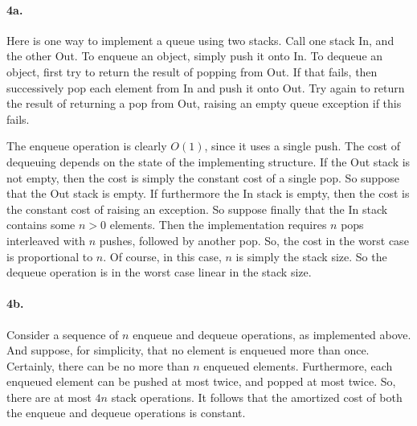 \documentclass[
]{article}
\begin{document}
\paragraph{4a.} Here is one way to implement a queue using two stacks. Call one stack In, and the other Out.  To enqueue an object, simply push it onto In.  To dequeue an object, first try to return the result of popping from Out.  If that fails, then successively pop each element from In and push it onto Out.   Try again to return the result of returning a pop from Out, raising an empty queue exception if this fails.

The enqueue operation is clearly $O(1)$, since it uses a single push.  The cost of dequeuing depends on the state of the implementing structure.  If the Out stack is not empty, then the cost is simply the constant cost of a single pop.  So suppose that the Out stack is empty.  If furthermore the In stack is empty, then the cost is the constant cost of raising an exception.  So suppose finally that the In stack contains some $n>0$ elements.  Then the implementation requires $n$ pops interleaved with $n$ pushes, followed by another pop.  So, the cost in the worst case is proportional to $n$.  Of course, in this case, $n$ is simply the stack size.  So the dequeue operation is in the worst case linear in the stack size.

\paragraph{4b.}  Consider a sequence of $n$ enqueue and dequeue operations, as implemented above.  And suppose, for simplicity, that no element is enqueued more than once.  Certainly, there can be no more than $n$ enqueued elements.  Furthermore, each enqueued element can be pushed at most twice, and popped at most twice.    So, there are at most $4n$ stack operations.  It follows that the amortized cost of both the enqueue and dequeue operations is constant.
\end{document}
